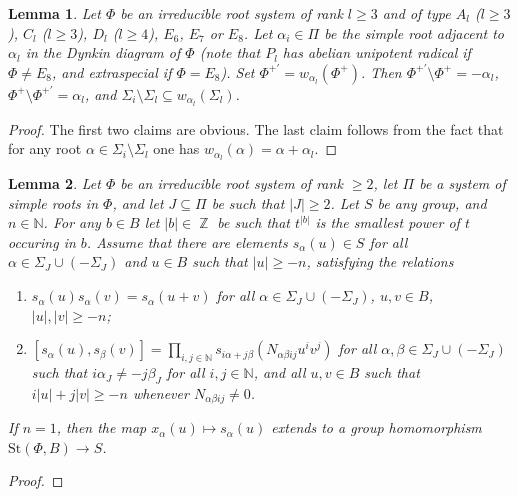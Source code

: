 \documentclass[oneside,12pt]{amsart}
\numberwithin{equation}{section}
\newtheorem{lem}{Lemma}
\numberwithin{lem}{section}
\theoremstyle{definition}
\theoremstyle{remark}
\DeclareMathOperator{\ZZ}{{\mathbb Z}}
\newcommand{\Stb}{\mathrm{St}}
\begin{document}
\begin{lem}\label{lem:parab-pairs}
Let $\Phi$ be an irreducible root system of rank $l\ge 3$ and of type $A_l$ ($l\ge 3$), $C_l$ ($l\ge 3$),
$D_l$ ($l\ge 4$), $E_6$, $E_7$ or $E_8$.
Let $\alpha_i\in\Pi$ be the simple root adjacent to $\alpha_l$ in the Dynkin diagram of $\Phi$
(note that $P_l$ has abelian unipotent radical if $\Phi\neq E_8$, and extraspecial if $\Phi=E_8$).
Set $\Phi^{+'}=w_{\alpha_l}(\Phi^+)$.
Then $\Phi^{+'}\setminus\Phi^+=-\alpha_l$, $\Phi^+\setminus \Phi^{+'}=\alpha_l$, and
$\Sigma_i\setminus\Sigma_l\subseteq w_{\alpha_l}(\Sigma_l)$.
\end{lem}
\begin{proof}
The first two claims are obvious. The last claim follows from the fact that for any root
$\alpha\in\Sigma_i\setminus\Sigma_l$ one has $w_{\alpha_l}(\alpha)=\alpha+\alpha_l$.
\end{proof}

\begin{lem}\label{lem:tul3.3}
 Let $\Phi$ be an irreducible root system of rank $\ge 2$, let $\Pi$ be a system of simple roots in $\Phi$,
and let $J\subseteq\Pi$ be such that $|J|\ge 2$.
Let $S$ be any group, and $n\in\mathbb{N}$. For any $b\in B$ let $|b|\in\ZZ$ be such that $t^{|b|}$ is the
smallest power of $t$ occuring in $b$.
Assume that there are elements $s_\alpha(u)\in S$ for all $\alpha\in\Sigma_J\cup(-\Sigma_J)$ and
$u\in B$ such that $|u|\ge -n$, satisfying the relations
\begin{enumerate}
\item $s_\alpha(u)s_\alpha(v)=s_\alpha(u+v)$ for all $\alpha\in \Sigma_J\cup(-\Sigma_J)$, $u,v\in B$,
$|u|,|v|\ge -n$;
\item $[s_\alpha(u),s_\beta(v)]=\prod\limits_{i,j\in\mathbb{N}}s_{i\alpha+j\beta}(N_{\alpha\beta ij}u^iv^j)$
for all $\alpha,\beta\in \Sigma_J\cup(-\Sigma_J)$ such that $i\alpha_J\neq -j\beta_J$ for all $i,j\in\mathbb{N}$,
and all $u,v\in B$ such that $i|u|+j|v|\ge -n$ whenever $N_{\alpha\beta ij}\neq 0$.
\end{enumerate}
If $n=1$, then the map $x_\alpha(u)\mapsto s_\alpha(u)$ extends to a group homomorphism $\Stb(\Phi,B)\to S$.
\end{lem}
\begin{proof}

\end{proof}
\end{document}
